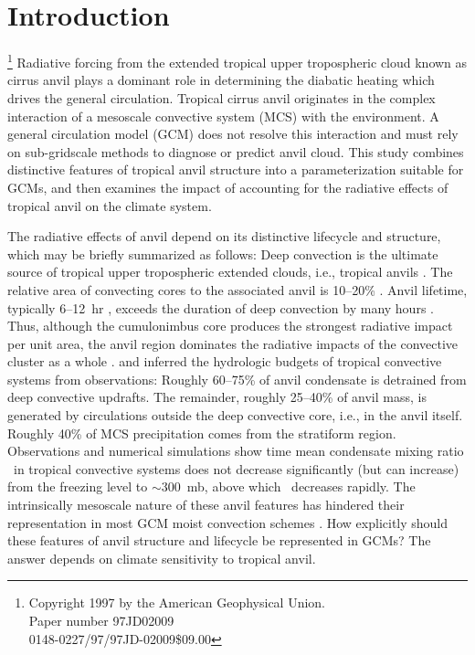 \documentclass[twoside,agupp]{aguplus}
\begin{document}
\section{Introduction}\label{sec:anv_intro}

\renewcommand{\footnoterule}{} 
\setlength{\footnotesep}{12pt} 
\footnote{\noindent Copyright 1997 by the American Geophysical Union.\\
Paper number 97JD02009\\
0148-0227/97/97JD-02009\$09.00}%
Radiative forcing from the extended tropical upper tropospheric cloud
known as cirrus anvil plays a dominant role in determining the
diabatic heating which drives the general circulation.  
Tropical cirrus anvil originates in the complex interaction of a
mesoscale convective system (MCS) with the environment.
A general circulation model (GCM) does not resolve this interaction
and must rely on sub-gridscale methods to diagnose or predict anvil
cloud. 
This study combines distinctive features of tropical anvil structure
into a parameterization suitable for GCMs, and then examines the
impact of accounting for the radiative effects of tropical anvil on
the climate system. 

The radiative effects of anvil depend on its distinctive lifecycle and
structure, which may be briefly summarized as follows:
Deep convection is the ultimate source of tropical upper tropospheric
extended clouds, i.e., tropical anvils \cite[e.g.,][]{WeS80}. 
The relative area of convecting cores to the associated anvil is
10--20\% \cite[]{LeH80,FDR90}.
Anvil lifetime, typically 6--12~hr \cite[]{ALV88,LeH80}, exceeds the
duration of deep convection by many hours \cite[]{Hou89}.
Thus, although the cumulonimbus core produces the strongest radiative
impact per unit area, the anvil region dominates the radiative impacts
of the convective cluster as a whole \cite[]{MaR93,WSS932}.
\cite{LeH80} and \cite[]{GaH83} inferred the hydrologic budgets of 
tropical convective systems from observations:
Roughly 60--75\% of anvil condensate is detrained from deep convective
updrafts. 
The remainder, roughly 25--40\% of anvil mass, is generated by
circulations outside the deep convective core, i.e., in the anvil
itself. 
Roughly 40\% of MCS precipitation comes from the stratiform region. 
Observations and numerical simulations
\cite[e.g.,][]{WSS931,SLT94,GMK96,McH96,McH971} show time mean
condensate mixing ratio \qc\ in tropical convective systems 
does not decrease significantly (but can increase) from the freezing 
level to $\sim 300$~mb, above which \qc\ decreases rapidly.  
The intrinsically mesoscale nature of these anvil features has
hindered their representation in most GCM moist convection schemes 
\cite[]{Don93}.   
How explicitly should these features of anvil structure and lifecycle
be represented in GCMs?  
The answer depends on climate sensitivity to tropical anvil.
\end{document}
